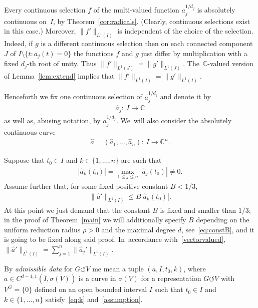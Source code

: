 \documentclass[11pt]{article}
\numberwithin{equation}{section}
\numberwithin{equation}{section}
\def\rh{\rho}
\def\si{\sigma}
\def\C{\mathbb{C}}
\def\ol{\overline}
\def\we{\hat}
\def\acts{\circlearrowleft}
\begin{document}
\begin{Remark} \label{rem:notation}
Every continuous selection $f$ of
the multi-valued function $a_j^{1/d_j}$ is absolutely continuous on~$I$, by Theorem~\ref{cor:radicals}.
(Clearly, continuous selections exist in this case.)
Moreover, $\|f'\|_{L^1(I)}$ is independent of the
choice of the selection. Indeed, if $g$ is a different continuous selection then on each connected component $J$ of
$I \setminus \{t \colon a_j(t)=0\}$ the functions $f$ and $g$ just differ by multiplication with a fixed $d_j$-th root of unity.
Thus $\|f'\|_{L^1(J)} = \|g'\|_{L^1(J)}$. The~$\C$-valued version of Lemma~\ref{lem:extend} implies that $\|f'\|_{L^1(I)} = \|g'\|_{L^1(I)}$.

Henceforth we fix one continuous selection of $a_j^{1/d_j}$ and
denote it by
\begin{gather*}
 \we a_j \colon\ I \to \C
\end{gather*}
as well as, abusing notation, by $a_j^{1/d_j}$. We~will also consider the absolutely continuous curve
\begin{gather*}
 \we a = (\we a_1,\dots,\we a_n) \colon\ I \to \C^n.
\end{gather*}
\end{Remark}






Suppose that $t_0 \in I$ and $k \in \{1,\dots,n\}$ are such that
\begin{gather} \label{eq:k}
 |\we a_k(t_0)| = \max_{1 \le j \le n} |\we a_j(t_0)| \ne 0.
 \end{gather}
Assume further that, for some fixed positive constant $B < 1/3$,
\begin{gather}\label{assumption}
 \|\we a'\|_{L^1 (I)} \le B |\we a_k(t_0)|.
\end{gather}
At this point we just demand that the constant $B$ is fixed and smaller than $1/3$; in the proof of Theorem~\ref{main}
we will additionally specify $B$ depending on the uniform reduction radius $\rh>0$ and the maximal degree $d$, see~\eqref{eq:constB},
and it is going to be fixed along said proof. In~accordance with~\eqref{vectorvalued}, $\|\we a'\|_{L^1 (I)} = \sum_{j=1}^n \|\we a_j'\|_{L^1 (I)}$.

\begin{Definition}
 By \emph{admissible data} for $G \acts V$ me mean a tuple $(a, I, t_0, k)$, where
 $a \in C^{d-1,1}(\ol I,\si(V))$ is a curve in $\si(V)$ for a representation $G \acts V$ with $V^G = \{0\}$
 defined on an open bounded interval $I$ such that
 $t_0 \in I$ and $k \in \{1,\dots,n\}$ satisfy~\eqref{eq:k} and~\eqref{assumption}.
\end{Definition}
\end{document}
